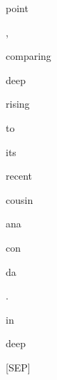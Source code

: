 \documentclass[varwidth=150mm]{standalone}
\begin{document}
\begin{CJK*}{UTF8}{gbsn}
{{{\colorbox{red!5.585947036743164}{\strut point} \colorbox{red!2.6637766361236572}{\strut ,} \colorbox{red!30.112899780273438}{\strut comparing} \colorbox{red!4.086994647979736}{\strut deep} \colorbox{red!4.8639349937438965}{\strut rising} \colorbox{red!10.696956634521484}{\strut to} \colorbox{red!33.39034652709961}{\strut its} \colorbox{red!6.813505172729492}{\strut recent} \colorbox{red!15.54547119140625}{\strut cousin} \colorbox{red!0.0}{\strut ana}\colorbox{red!2.180208206176758}{\strut con}\colorbox{red!6.281781196594238}{\strut da} \colorbox{red!0.0}{\strut .} \colorbox{red!13.252663612365723}{\strut in} \colorbox{red!13.06600570678711}{\strut deep} \colorbox{red!3.293666362762451}{\strut [SEP]}
}}}
\end{CJK*}
\end{document}
